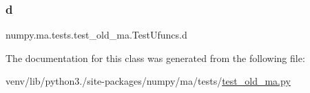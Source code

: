 \subsubsection{\texorpdfstring{d}{d}}
{\footnotesize\ttfamily numpy.\+ma.\+tests.\+test\+\_\+old\+\_\+ma.\+Test\+Ufuncs.\+d}



The documentation for this class was generated from the following file\+:\begin{DoxyCompactItemize}
\item 
venv/lib/python3./site-\/packages/numpy/ma/tests/\hyperlink{test__old__ma_8py}{test\+\_\+old\+\_\+ma.\+py}\end{DoxyCompactItemize}
